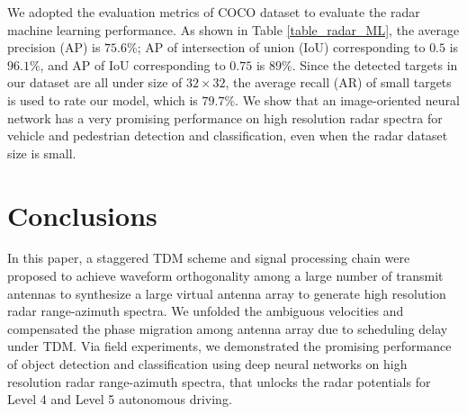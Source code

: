 \documentclass[conference]{IEEEtran}
\begin{document}
We adopted the evaluation metrics of COCO dataset to evaluate the radar machine learning performance. As shown in Table \ref{table_radar_ML}, the average precision (AP) is $75.6\%$; AP of intersection of union (IoU) corresponding to $0.5$ is $96.1\%$, and AP of IoU corresponding to $0.75$ is $89\%$. Since the detected targets in our dataset are all under size of $32\times 32$, the average recall (AR) of small targets is used to rate our model, which is $79.7\%$. We show that an image-oriented neural network has a very promising 
performance on high resolution radar spectra for vehicle and pedestrian detection and classification, even when the radar dataset size is small.

\section{Conclusions}
In this paper, a staggered TDM scheme and signal processing chain were proposed to achieve waveform orthogonality among a large number of transmit antennas to synthesize a large virtual antenna array to generate high resolution radar range-azimuth spectra. We unfolded the ambiguous velocities and compensated the phase migration among antenna array due to scheduling delay under TDM.  Via field experiments, we demonstrated the promising performance of object detection and classification using deep neural networks on  high resolution radar range-azimuth spectra, that unlocks the radar potentials for Level 4 and Level 5 autonomous driving.  




\end{document}
